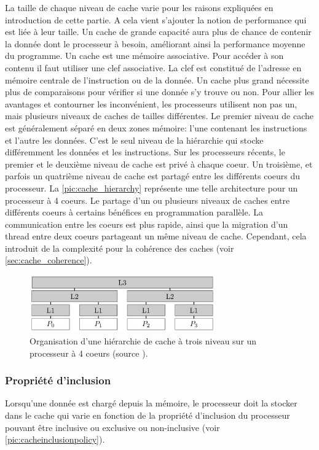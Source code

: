 La taille de chaque niveau de cache varie pour les raisons expliquées en introduction de cette partie. A cela vient s'ajouter la notion de performance qui est liée à leur taille. Un cache de grande capacité aura plus de chance de contenir la donnée dont le processeur à besoin, améliorant ainsi la performance moyenne du programme. Un cache est une mémoire associative. Pour accéder à son contenu il faut utiliser une clef associative. La clef est constitué de l’adresse en mémoire centrale de l’instruction ou de la donnée. Un cache plus grand nécessite plus de comparaisons pour vérifier si une donnée s'y trouve ou non. Pour allier les avantages et contourner les inconvénient, les processeurs utilisent non pas un, mais plusieurs niveaux de caches de tailles différentes.
Le premier niveau de cache est généralement séparé en deux zones mémoire: l'une contenant les instructions et l'autre les données. C'est le seul niveau de la hiérarchie qui stocke différemment les données et les instructions. Sur les processeurs récents, le premier et le deuxième niveau de cache est privé à chaque coeur. Un troisième, et parfois un quatrième niveau de cache est partagé entre les différents coeurs du processeur. La \autoref{pic:cache_hierarchy} représente une telle architecture pour un processeur à 4 coeurs. Le partage d’un ou plusieurs niveaux de caches entre différents coeurs à certains bénéfices en programmation parallèle. La communication entre les coeurs est plus rapide, ainsi que la migration d’un thread entre deux coeurs partageant un même niveau de cache. Cependant, cela introduit de la complexité pour la cohérence des caches (voir \autoref{sec:cache_coherence}).

\begin{figure}
    \center
    \includegraphics[width=8cm]{images/cache_hierarchy.png}
    \caption{\label{pic:cache_hierarchy} Organisation d'une hiérarchie de cache à trois niveau sur un processeur à 4 coeurs (source \cite{putigny2014benchmark}).}
\end{figure}




\subsubsection{Propriété d'inclusion}
Lorsqu'une donnée est chargé depuis la mémoire, le processeur doit la stocker dans le cache qui varie en fonction de la propriété d'inclusion du processeur pouvant être inclusive ou exclusive ou non-inclusive (voir \autoref{pic:cacheinclusionpolicy}).

